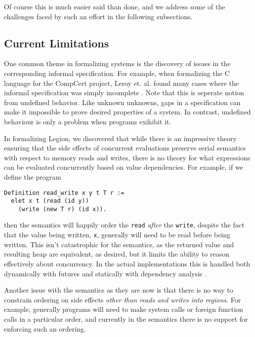 \documentclass[sigconf]{acmart}
\begin{document}
Of course this is much easier said than done, and we address some of the challenges
faced by such an effort in the following subsections.

\subsection{Current Limitations}

One common theme in formalizing systems is the discovery of issues in the
corresponding informal specification. For example, when formalizing the C
language for the CompCert project, Leroy et. al. found many cases where the
informal specification was simply incomplete \cite{leroy2012compcert}. Note
that this is seperate notion from undefined behavior. Like unknown unknowns,
gaps in a specification can make it impossible to prove desired properties of a
system.  In contrast, undefined behaviour is only a problem when programs
exihibit it.

In formalizing Legion, we discovered that while there is an impressive theory
ensuring that the side effects of concurrent evaluations preserve serial
semantics with respect to memory reads and writes, there is no theory for what
expressions can be evaluated concurrently based on value dependencies. For
example, if we define the program
\begin{center}
\begin{BVerbatim}
Definition read_write x y t T r :=
  elet x t (read (id y)) 
    (write (new T r) (id x)).
\end{BVerbatim}
\end{center}
then the semantics will happily order the \texttt{read} \emph{after} the
\texttt{write}, despite the fact that the value being written, \texttt{x},
generally will need to be read before being written. This isn't catastrophic
for the semantics, as the returned value and resulting heap are equivalent, 
as desired, but it limits the ability to reason effectively about concurrency. 
In the actual implementations this is handled both dynamically with futures
and statically with dependency analysis \cite{slaughter2015regent}.

Another issue with the semantics as they are now is that there is no way to 
constrain ordering on side effects \emph{other than reads and writes into
regions}. For example, generally programs will need to make system calls or
foreign function calls in a particular order, and currently in the semantics
there is no support for enforcing such an ordering.
\end{document}
